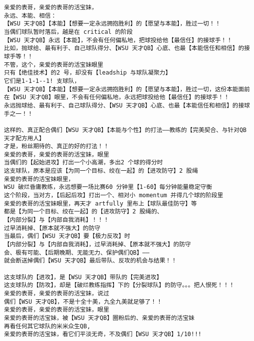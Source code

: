 \documentclass[9pt, b5paper]{article}
\begin{document}
\begin{verbatim}
亲爱的表哥，亲爱的表哥的活宝妹，
永远、本能、相信：
【WSU 天才QB】【本能】【想要一定永远拥抱胜利】的【愿望与本能】，胜过一切！！
当偶们球队暂时落后，越是在 critical 的阶段
【WSU 天才QB】永远【本能】，不会有任何偏私地，把球投给他【最信任】的接球手！！
比如，抛球给、最有利于、自己球队得分、【WSU 天才QB】心底、也最【本能信任和相信】的接球手等！！
不管，这个，亲爱的表哥的活宝妹眼里
只有【绝佳技术】的2 号，却没有【leadship 与球队凝聚力】
它们是1-1-1--1! 支球队，
【WSU 天才QB】【本能】【想要一定永远拥抱胜利】的【愿望与本能】，胜过一切，这份本能面前
在【WSU 天才QB】眼里，不会有任何偏私地，永远把球投给他【最信任】的接球手！！
永远抛球给、最有利于、自己球队得分、【WSU 天才QB】心底、也最【本能信任和相信】的接球手之一！！

这样的、真正配合偶们【WSU 天才QB】【本能与个性】的打法——教练的【完美契合、与针对QB 天才配方用人】
才是，粉丝期待的、真正的好的打法！！
亲爱的表哥，亲爱的表哥的活宝妹，眼里
当偶们的【起始进攻】打出一个小高潮，多出2 个球的得分时
这支球队，原本是应该【为同一个目标、绞在一起】的【进攻防守】2 股绳
亲爱的表哥的活宝妹眼里，
WSU 破烂昏庸教练，永远想要一场比赛60 分钟里【1-60】每分钟能量稳定守衡
这个阶段，当对方，【后起后攻】打出一个、相对小 momentum 并得几个球的阶段里
亲爱的表哥的活宝妹眼里，再天才 artfully 里布上【球队最佳防守】等
都是【为同一个目标、绞在一起】的【进攻防守】2 股绳的、
【内部分裂】与【内部自我消耗】！！！
过早消耗掉、【原本就不强大】的防守
当最后，偶们【WSU 天才QB】要【极力反攻】时
【内部分裂】与【内部自我消耗】，过早消耗掉、【原本就不强大】的防守
会、极有可能、【后期晚期、无能无力、保护偶们QB】——
就会断送掉偶们【WSU 天才QB】最后带队、反攻的机会与结果！！

这支球队的【进攻】，是【WSU 天才QB】带队的【完美进攻】
这支球队的【防攻】，却是【破烂教练指挥】下的【分裂球队】的防守。。。把人恨死！！！
亲爱的表哥，亲爱的表哥的活宝妹，说过
偶们【WSU 天才QB】，不是十全十美，九全九美就足够了！！
亲爱的表哥，亲爱的表哥的活宝妹，眼里
亲爱的表哥的活宝妹，被【WSU 天才QB】圈粉后的、亲爱的表哥的活宝妹
再看任何其它球队的米米众生QB,
亲爱的表哥的活宝妹，看它们平淡无奇，不及偶们【WSU 天才QB】1/10!!!


\end{verbatim}
\end{document}
